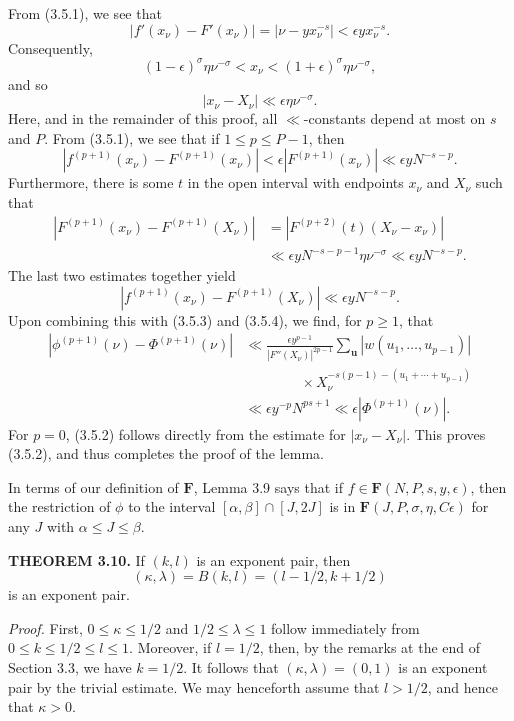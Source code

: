 \documentclass[10pt]{article}
\newcommand{\Fclass}{\mathbf{F}}
\begin{document}
From (3.5.1), we see that
\[
 |f'(x_\nu)-F'(x_\nu)|
 =|\nu-yx_\nu^{-s}|<\epsilon yx_\nu^{-s}.
\]
Consequently,
\[
 (1-\epsilon)^\sigma\eta\nu^{-\sigma}
 <x_\nu
 <(1+\epsilon)^\sigma\eta\nu^{-\sigma},
\]
and so
\[
 |x_\nu-X_\nu|\ll\epsilon\eta\nu^{-\sigma}.
\]
Here, and in the remainder of this proof, all $\ll$-constants depend at most
on $s$ and $P$. From (3.5.1), we see that if $1\leq p\leq P-1$, then
\[
 |f^{(p+1)}(x_\nu)-F^{(p+1)}(x_\nu)|
 <\epsilon|F^{(p+1)}(x_\nu)|
 \ll\epsilon yN^{-s-p}.
\]
Furthermore, there is some $t$ in the open interval with endpoints $x_\nu$
and $X_\nu$ such that
\[
\begin{aligned}
 |F^{(p+1)}(x_\nu)-F^{(p+1)}(X_\nu)|
 &=|F^{(p+2)}(t)(X_\nu-x_\nu)| \\
 &\ll \epsilon yN^{-s-p-1}\eta\nu^{-\sigma}
 \ll \epsilon yN^{-s-p}.
\end{aligned}
\]
The last two estimates together yield
\[
 |f^{(p+1)}(x_\nu)-F^{(p+1)}(X_\nu)|
 \ll\epsilon yN^{-s-p}.
\]
Upon combining this with (3.5.3) and (3.5.4), we find, for $p\geq1$, that
\[
\begin{aligned}
 |\phi^{(p+1)}(\nu)-\Phi^{(p+1)}(\nu)|
 &\ll\frac{\epsilon y^{p-1}}{|F''(X_\nu)|^{2p-1}}
 \sum_{\mathbf u}|w(u_1,\ldots,u_{p-1})|\\
 &\qquad\qquad\times
 X_\nu^{-s(p-1)-(u_1+\cdots+u_{p-1})} \\
 &\ll\epsilon y^{-p}N^{ps+1}
 \ll\epsilon|\Phi^{(p+1)}(\nu)|.
\end{aligned}
\]
For $p=0$, (3.5.2) follows directly from the estimate for
$|x_\nu-X_\nu|$. This proves (3.5.2), and thus completes the proof of the
lemma.

In terms of our definition of $\Fclass$, Lemma 3.9 says that if
$f\in\Fclass(N,P,s,y,\epsilon)$, then the restriction of $\phi$ to the
interval $[\alpha,\beta]\cap[J,2J]$ is in
$\Fclass(J,P,\sigma,\eta,C\epsilon)$ for any $J$ with
$\alpha\leq J\leq\beta$.

\medskip
\noindent\textbf{THEOREM 3.10.}
If $(k,l)$ is an exponent pair, then
\[
 (\kappa,\lambda)=B(k,l)=(l-1/2,k+1/2)
\]
is an exponent pair.

\noindent\textit{Proof.}
First, $0\leq\kappa\leq1/2$ and $1/2\leq\lambda\leq1$ follow immediately
from $0\leq k\leq1/2\leq l\leq1$. Moreover, if $l=1/2$, then, by the remarks
at the end of Section 3.3, we have $k=1/2$. It follows that
$(\kappa,\lambda)=(0,1)$ is an exponent pair by the trivial estimate. We may
henceforth assume that $l>1/2$, and hence that $\kappa>0$.
\end{document}
